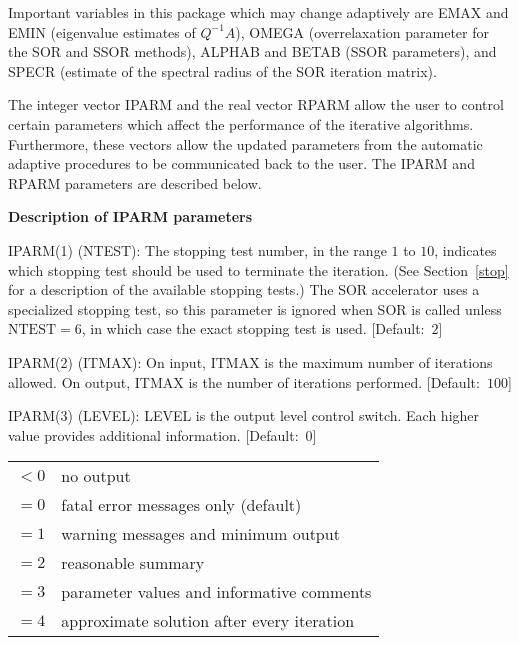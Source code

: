    Important variables in this package which may change adaptively
are EMAX and EMIN (eigenvalue estimates of $Q^{-1}A$), OMEGA
(overrelaxation
parameter for the SOR and SSOR methods), ALPHAB and BETAB (SSOR
parameters), and SPECR (estimate of the spectral radius of the SOR
iteration matrix).
 
   The integer vector IPARM and the real vector RPARM allow the user
to control certain parameters which affect the performance of the
iterative algorithms.  Furthermore, these vectors allow the updated
parameters from the automatic adaptive procedures to be communicated
back to the user.  The IPARM and RPARM parameters are described
below.
 
\bigskip
\noindent
{\bf Description of IPARM parameters}
\bigskip
 
\begin{list}{}{
               \leftmargin 1.00in \rightmargin 0.25in}
 \item[IPARM(1) \hfill](NTEST):
         The stopping test number, in the range $1$ to $10$, indicates
         which stopping test should be used to terminate the
         iteration.  (See Section~\ref{stop} for a description
         of the available stopping tests.)  The SOR accelerator
         uses a specialized stopping test, so this parameter is
         ignored when SOR is called unless $\mbox{NTEST}=6$, in which
         case the exact stopping test is used.  \mbox{[Default: $2$]}
 
 \item[IPARM(2) \hfill](ITMAX):
         On input, ITMAX is the maximum number of iterations
         allowed. On output, ITMAX is the number of iterations
         performed.  \mbox{[Default: $100$]}
 
\item[IPARM(3) \hfill](LEVEL):
         LEVEL is the output level control switch.  Each higher
         value provides additional information.  \mbox{[Default: $0$]}
 
         \begin{tabular}{ll}
          $< 0$ & no output \\
          $= 0$ & fatal error messages only (default) \\
          $= 1$ & warning messages and minimum output \\
          $= 2$ & reasonable summary \\
          $= 3$ & parameter values and informative comments \\
          $= 4$ & approximate solution after every iteration \\
         \end{tabular}
 

\end{list}
